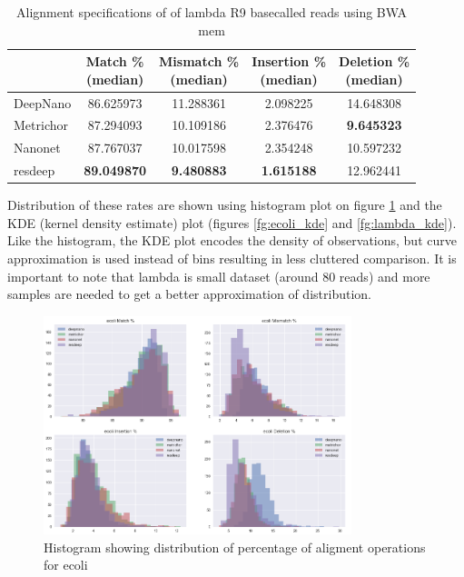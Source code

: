 \documentclass[times, utf8, diplomski, numeric, english]{fer}
\begin{document}
\begin{table}[H]
	\caption{Alignment specifications of of lambda R9 basecalled reads using BWA mem}
	\label{tbl:lambda_rates_bwa}
	\centering
	\begin{tabular}{lcccc}
		\toprule
		{} &  \thead{Match \% \\(median)} &  \thead{Mismatch \% \\(median)} &  \thead{Insertion \% \\(median)} &  \thead{Deletion \% \\(median)} \\
		\midrule
		
		DeepNano   &                  86.625973 &                     11.288361 &                       2.098225 &                     14.648308 \\
		Metrichor  &                  87.294093 &                     10.109186 &                       2.376476 &                      \textbf{9.645323 }\\
		Nanonet    &                  87.767037 &                     10.017598 &                       2.354248 &                     10.597232 \\
		resdeep    &                 \textbf{ 89.049870} &                     \textbf{ 9.480883} &                       \textbf{1.615188 }&                     12.962441 \\
		\bottomrule
	\end{tabular}
	
\end{table}


Distribution of these rates are shown using  histogram plot on figure \ref{fg:hist} and the KDE (kernel density estimate) plot (figures \ref{fg:ecoli_kde} and \ref{fg:lambda_kde}). Like the histogram, the KDE plot encodes the density of observations, but curve approximation is used instead of bins resulting in less cluttered comparison. 
It is important to note that lambda is small dataset (around 80 reads) and more samples are needed to get a better approximation of distribution.

\begin{figure}[!htb]
	\begin{center}
		\includegraphics[width=0.8\textwidth]{./imgs/results/ecoli/hist_20.png}
		\caption{Histogram showing distribution of percentage of aligment operations for ecoli}
		\label{fg:hist}
	\end{center}
\end{figure}
\end{document}
